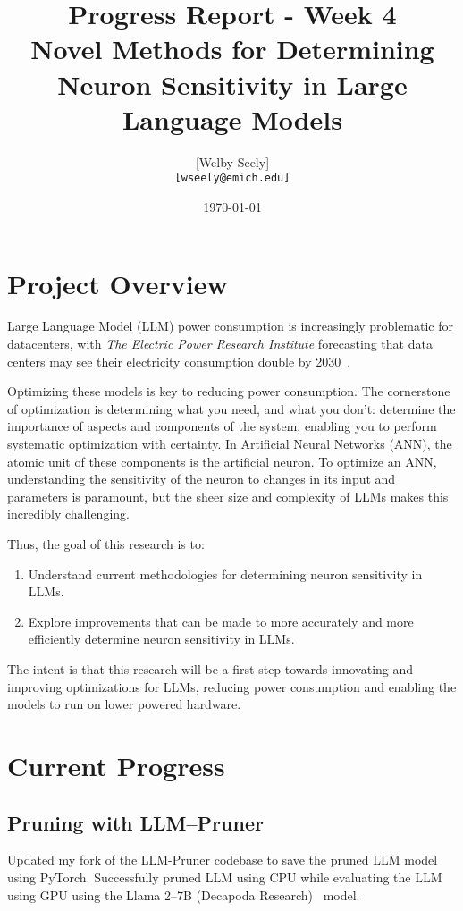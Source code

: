 \documentclass{article}
\title{Progress Report - Week 4 \\
\large Novel Methods for Determining Neuron Sensitivity in Large Language Models}
\author{
    [Welby Seely] \\
    \texttt{[wseely@emich.edu]}
}
\date{\today}
\begin{document}
    \maketitle


    \section{Project Overview}\label{sec:project-overview}
    Large Language Model (LLM) power consumption is increasingly problematic for datacenters, with \textit{The Electric Power
    Research Institute} forecasting that data centers may see their electricity consumption double by
    2030~\cite{kindig2024}.

    Optimizing these models is key to reducing power consumption.
    The cornerstone of optimization is determining what you need, and what you don't: determine the importance of
    aspects and components of the system, enabling you to perform systematic optimization with certainty.
    In Artificial Neural Networks (ANN), the atomic unit of these components is the artificial neuron.
    To optimize an ANN, understanding the sensitivity of the neuron to changes in its input and parameters is paramount,
    but the sheer size and complexity of LLMs makes this incredibly challenging.

    Thus, the goal of this research is to:
    \begin{enumerate}
        \item Understand current methodologies for determining neuron sensitivity in LLMs.
        \item Explore improvements that can be made to more accurately and more efficiently determine neuron sensitivity in
        LLMs.
    \end{enumerate}

    The intent is that this research will be a first step towards innovating and improving optimizations for LLMs,
    reducing power consumption and enabling the models to run on lower powered hardware.


    \section{Current Progress}\label{sec:current-progress}

    \subsection{Pruning with LLM--Pruner}\label{subsec:pruning-with-llm--pruner}
    Updated my fork of the LLM-Pruner codebase to save the pruned LLM model using PyTorch.
    Successfully pruned LLM using CPU while evaluating the LLM using GPU using the Llama 2--7B (Decapoda Research)~\cite{decapoda-llama-7B} model.
\end{document}
